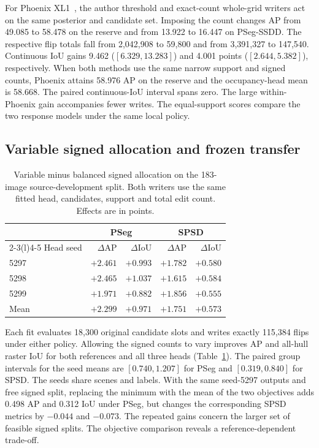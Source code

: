 For Phoenix XL1~\cite{phoenix}, the author threshold and exact-count whole-grid writers act on the same posterior and candidate set. Imposing the count changes AP from 49.085 to 58.478 on the reserve and from 13.922 to 16.447 on PSeg-SSDD. The respective flip totals fall from 2,042,908 to 59,800 and from 3,391,327 to 147,540. Continuous IoU gains 9.462 (\([6.329,13.283]\)) and 4.001 points (\([2.644,5.382]\)), respectively. When both methods use the same narrow support and signed counts, Phoenix attains 58.976 AP on the reserve and the occupancy-head mean is 58.668. The paired continuous-IoU interval spans zero. The large within-Phoenix gain accompanies fewer writes. The equal-support scores compare the two response models under the same local policy.

\subsection{Variable signed allocation and frozen transfer}
\label{sec:variable-sign-results}

\begin{table}[t]
 \caption{Variable minus balanced signed allocation on the 183-image source-development split. Both writers use the same fitted head, candidates, support and total edit count. Effects are in points.}
 \label{tab:dual-sign-seeds}
 \centering\footnotesize
 \setlength{\tabcolsep}{4pt}
 \begin{tabular}{@{}lrrrr@{}}
 \toprule
 & \multicolumn{2}{c}{PSeg} & \multicolumn{2}{c}{SPSD}\\
 \cmidrule(lr){2-3}\cmidrule(l){4-5}
 Head seed & \(\Delta\)AP & \(\Delta\)IoU & \(\Delta\)AP & \(\Delta\)IoU\\
 \midrule
 5297 & \(+2.461\) & \(+0.993\) & \(+1.782\) & \(+0.580\)\\
 5298 & \(+2.465\) & \(+1.037\) & \(+1.615\) & \(+0.584\)\\
 5299 & \(+1.971\) & \(+0.882\) & \(+1.856\) & \(+0.555\)\\
 Mean & \(+2.299\) & \(+0.971\) & \(+1.751\) & \(+0.573\)\\
 \bottomrule
 \end{tabular}
\end{table}

Each fit evaluates 18,300 original candidate slots and writes exactly 115,384 flips under either policy. Allowing the signed counts to vary improves AP and all-hull raster IoU for both references and all three heads (Table~\ref{tab:dual-sign-seeds}). The paired group intervals for the seed means are \([0.740,1.207]\) for PSeg and \([0.319,0.840]\) for SPSD. The seeds share scenes and labels. With the same seed-5297 outputs and free signed split, replacing the minimum with the mean of the two objectives adds 0.498 AP and 0.312 IoU under PSeg, but changes the corresponding SPSD metrics by \(-0.044\) and \(-0.073\). The repeated gains concern the larger set of feasible signed splits. The objective comparison reveals a reference-dependent trade-off.

